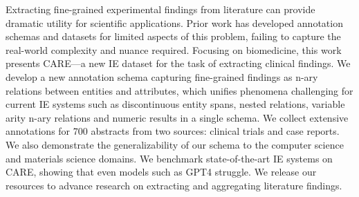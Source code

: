 Extracting fine-grained experimental findings from literature can provide dramatic utility for scientific applications. Prior work has developed annotation schemas and datasets for limited aspects of this problem, failing to capture the real-world complexity and nuance required. Focusing on biomedicine, this work presents CARE---a new IE dataset for the task of extracting clinical findings. We develop a new annotation schema capturing fine-grained findings as n-ary relations between entities and attributes, which unifies phenomena challenging for current IE systems such as discontinuous entity spans, nested relations, variable arity n-ary relations and numeric results in a single schema. We collect extensive annotations for 700 abstracts from two sources: clinical trials and case reports. We also demonstrate the generalizability of our schema to the computer science and materials science domains. We benchmark state-of-the-art IE systems on CARE, showing that even models such as GPT4 struggle. We release our resources to advance research on extracting and aggregating literature findings.